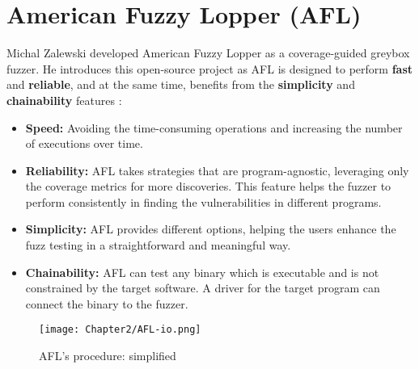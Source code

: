 \section{American Fuzzy Lopper (AFL)} \label{sec:2-afl}

Michal Zalewski developed American Fuzzy Lopper as a coverage-guided greybox fuzzer. He introduces this open-source project as  \cite{zalewski2014american} AFL is designed to perform \textbf{fast} and \textbf{reliable}, and at the same time, benefits from the \textbf{simplicity} and \textbf{chainability} features \cite{about_afl}:

\begin{itemize}
    \item \textbf{Speed:} Avoiding the time-consuming operations and increasing the number of executions over time.
    \item \textbf{Reliability:} AFL takes strategies that are program-agnostic, leveraging only the coverage metrics for more discoveries. This feature helps the fuzzer to perform consistently in finding the vulnerabilities in different programs.
    \item \textbf{Simplicity:} AFL provides different options, helping the users enhance the fuzz testing in a straightforward and meaningful way. 
    \item \textbf{Chainability:} AFL can test any binary which is executable and is not constrained by the target software. A driver for the target program can connect the binary to the fuzzer. 
\end{itemize}

\begin{figure}[!b]
    \texttt{[image: Chapter2/AFL-io.png]}
    \centering
    \captionsetup{justification=centering}
    \caption{AFL's procedure: simplified}
    \label{fig:afl-io}
\end{figure}

